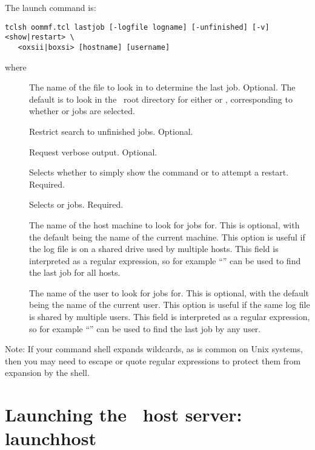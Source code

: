 The  launch command is:
\begin{verbatim}
tclsh oommf.tcl lastjob [-logfile logname] [-unfinished] [-v] <show|restart> \
   <oxsii|boxsi> [hostname] [username]
\end{verbatim}
where
\begin{description}
\item[]
The name of the file to look in to determine the last job.  Optional.
The default is to look in the \OOMMF\ root directory for either
 or , corresponding to whether
\app{oxsii} or \app{boxsi} jobs are selected.
\item[]
Restrict search to unfinished jobs.  Optional.
\item[]
Request verbose output.  Optional.
\item[]
Selects whether to simply show the command or to attempt a restart.
Required.
\item[]
Selects  or  jobs.  Required.
\item[]
The name of the host machine to look for jobs for.  This is optional,
with the default being the name of the current machine.  This option is
useful if the log file is on a shared drive used by multiple hosts.
This field is interpreted as a regular expression, so for example
``\cd{.*}'' can be used to find the last job for all hosts.
\item[]
The name of the user to look for jobs for.  This is optional,
with the default being the name of the current user.  This option is
useful if the same log file is shared by multiple users.
This field is interpreted as a regular expression, so for example
``\cd{.*}'' can be used to find the last job by any user.
\end{description}
Note: If your command shell expands wildcards, as is common on Unix
systems, then you may need to escape or quote regular expressions to
protect them from expansion by the shell.



\section{Launching the \OOMMF\ host server:
   launchhost\label{sec:launchhost}}%

